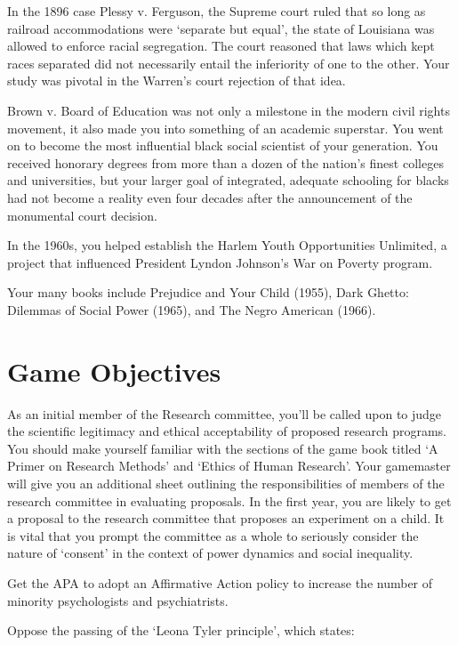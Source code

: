 \begin{refsection}
In the 1896 case Plessy v. Ferguson, the Supreme court ruled that so long as railroad accommodations were `separate but equal', the state of Louisiana was allowed to enforce racial segregation. The court reasoned that laws which kept races separated did not necessarily entail the inferiority of one to the other. Your study was pivotal in the Warren's court rejection of that idea.

Brown v. Board of Education was not only a milestone in the modern civil rights movement, it also made you into something of an academic superstar. You went on to become the most influential black social scientist of your generation. You received honorary degrees from more than a dozen of the nation's finest colleges and universities, but your larger goal of integrated, adequate schooling for blacks had not become a reality even four decades after the announcement of the monumental court decision.

In the 1960s, you helped establish the Harlem Youth Opportunities Unlimited, a project that influenced President Lyndon Johnson's War on Poverty program.

Your many books include Prejudice and Your Child (1955), Dark Ghetto: Dilemmas of Social Power (1965), and The Negro American (1966). 

\section{Game Objectives}
\label{gameobjectives}

As an initial member of the Research committee, you'll be called upon to judge the scientific legitimacy and ethical acceptability of proposed research programs. You should make yourself familiar with the sections of the game book titled `A Primer on Research Methods' and `Ethics of Human Research'. Your gamemaster will give you an additional sheet outlining the responsibilities of members of the research committee in evaluating proposals. In the first year, you are likely to get a proposal to the research committee that proposes an experiment on a child. It is vital that you prompt the committee as a whole to seriously consider the nature of `consent' in the context of power dynamics and social inequality.

Get the APA to adopt an Affirmative Action policy to increase the number of minority psychologists and psychiatrists.

Oppose the passing of the `Leona Tyler principle', which states:


\end{refsection}
